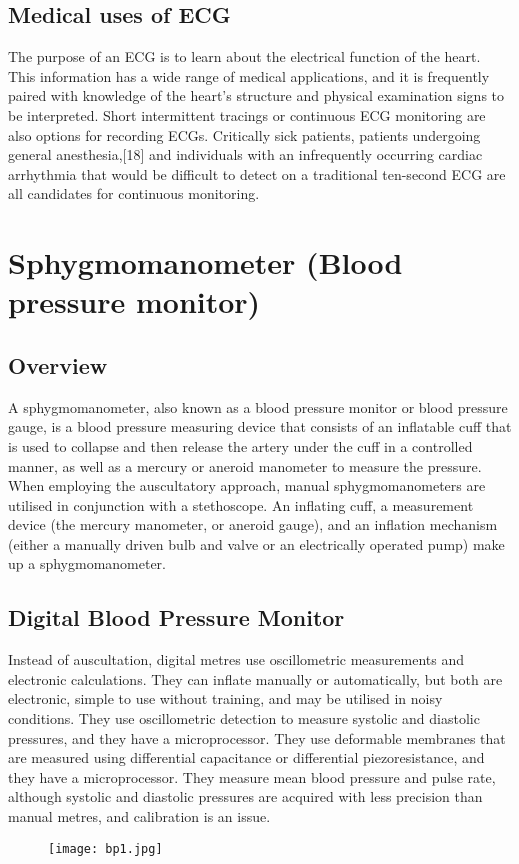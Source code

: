 \documentclass[12pt]{article}
\begin{document}
\subsection{Medical uses of ECG}
The purpose of an ECG is to learn about the electrical function of the heart. This information has a wide range of medical applications, and it is frequently paired with knowledge of the heart's structure and physical examination signs to be interpreted. Short intermittent tracings or continuous ECG monitoring are also options for recording ECGs. Critically sick patients, patients undergoing general anesthesia,[18] and individuals with an infrequently occurring cardiac arrhythmia that would be difficult to detect on a traditional ten-second ECG are all candidates for continuous monitoring.
\clearpage

\section{Sphygmomanometer (Blood pressure monitor)}
\subsection{Overview}
A sphygmomanometer, also known as a blood pressure monitor or blood pressure gauge, is a blood pressure measuring device that consists of an inflatable cuff that is used to collapse and then release the artery under the cuff in a controlled manner, as well as a mercury or aneroid manometer to measure the pressure. When employing the auscultatory approach, manual sphygmomanometers are utilised in conjunction with a stethoscope.
An inflating cuff, a measurement device (the mercury manometer, or aneroid gauge), and an inflation mechanism (either a manually driven bulb and valve or an electrically operated pump) make up a sphygmomanometer.
\\
\subsection{Digital Blood Pressure Monitor}
Instead of auscultation, digital metres use oscillometric measurements and electronic calculations. They can inflate manually or automatically, but both are electronic, simple to use without training, and may be utilised in noisy conditions. They use oscillometric detection to measure systolic and diastolic pressures, and they have a microprocessor. They use deformable membranes that are measured using differential capacitance or differential piezoresistance, and they have a microprocessor. They measure mean blood pressure and pulse rate, although systolic and diastolic pressures are acquired with less precision than manual metres, and calibration is an issue.
\\
\begin{figure}[h]
\centering
\texttt{[image: bp1.jpg]}
\label{fig_bp1}
\end{figure}
\\
\end{document}
